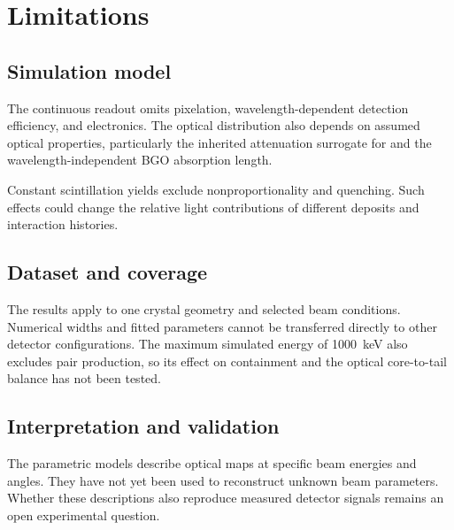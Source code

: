 \section{Limitations}
\subsection{Simulation model}

The continuous readout omits pixelation, wavelength-dependent detection efficiency, and electronics. The optical distribution also depends on assumed optical properties, particularly the inherited  attenuation surrogate for  and the wavelength-independent BGO absorption length.

Constant scintillation yields exclude nonproportionality and quenching. Such effects could change the relative light contributions of different deposits and interaction histories.

\subsection{Dataset and coverage}

The results apply to one crystal geometry and selected beam conditions. Numerical widths and fitted parameters cannot be transferred directly to other detector configurations. The maximum simulated energy of \qty{1000}{\kilo\electronvolt} also excludes pair production, so its effect on containment and the optical core-to-tail balance has not been tested.

\subsection{Interpretation and validation}

The parametric models describe optical maps at specific beam energies and angles. They have not yet been used to reconstruct unknown beam parameters. Whether these descriptions also reproduce measured detector signals remains an open experimental question.


